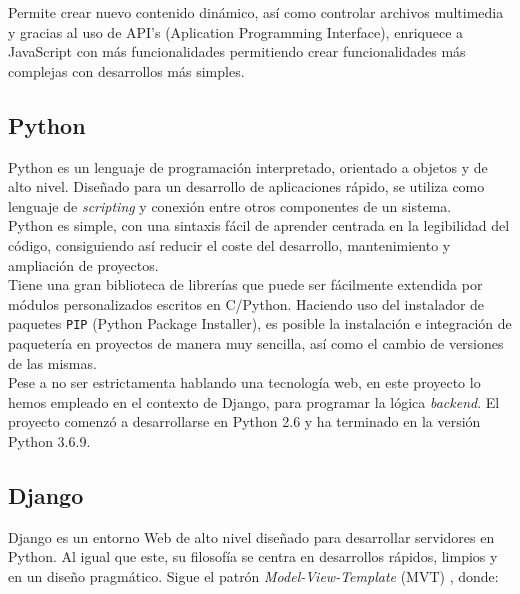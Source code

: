 \documentclass[11pt,a4paper]{book}
\begin{document}
				Permite crear nuevo contenido dinámico, así como controlar archivos multimedia y gracias al uso de API's (Aplication Programming Interface), enriquece a JavaScript con más funcionalidades permitiendo crear funcionalidades más complejas con desarrollos más simples.
				
			\subsection{Python}
				Python es un lenguaje de programación interpretado, orientado a objetos y de alto nivel. Diseñado para un desarrollo de aplicaciones rápido, se utiliza como lenguaje de \textit{scripting} y conexión entre otros componentes de un sistema.\\
				
				Python es simple, con una sintaxis fácil de aprender centrada en la legibilidad del código, consiguiendo así reducir el coste del desarrollo, mantenimiento y ampliación de proyectos.\\
				
				Tiene una gran biblioteca de librerías que puede ser fácilmente extendida por módulos personalizados escritos en C/Python. Haciendo uso del instalador de paquetes \texttt{PIP} (Python Package Installer), es posible la instalación e integración de paquetería en proyectos de manera muy sencilla, así como el cambio de versiones de las mismas.\\
				
				Pese a no ser estrictamenta hablando una tecnología web, en este proyecto lo hemos empleado en el contexto de Django, para programar la lógica \textit{backend}. El proyecto comenzó a desarrollarse en Python 2.6 y ha terminado en la versión Python 3.6.9.
				
				
			\subsection{Django}
				Django es un entorno Web de alto nivel diseñado para desarrollar servidores en Python. Al igual que este, su filosofía se centra en desarrollos rápidos, limpios y en un diseño pragmático. Sigue el patrón \textit{Model-View-Template} (MVT) \cite{Django MVC}, donde:\\
				
\end{document}
